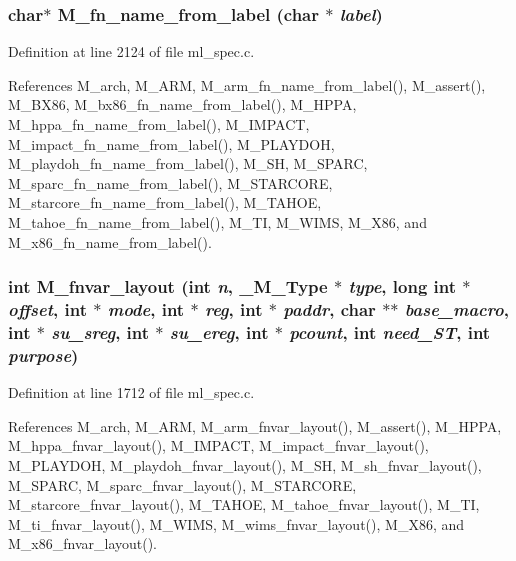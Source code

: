 \subsubsection{\setlength{\rightskip}{0pt plus 5cm}char$\ast$ M\_\-fn\_\-name\_\-from\_\-label (char $\ast$ {\em label})}\label{m__spec_8h_941cbbae90c867b67c1f123ba1ffeb7a}




Definition at line 2124 of file ml\_\-spec.c.

References M\_\-arch, M\_\-ARM, M\_\-arm\_\-fn\_\-name\_\-from\_\-label(), M\_\-assert(), M\_\-BX86, M\_\-bx86\_\-fn\_\-name\_\-from\_\-label(), M\_\-HPPA, M\_\-hppa\_\-fn\_\-name\_\-from\_\-label(), M\_\-IMPACT, M\_\-impact\_\-fn\_\-name\_\-from\_\-label(), M\_\-PLAYDOH, M\_\-playdoh\_\-fn\_\-name\_\-from\_\-label(), M\_\-SH, M\_\-SPARC, M\_\-sparc\_\-fn\_\-name\_\-from\_\-label(), M\_\-STARCORE, M\_\-starcore\_\-fn\_\-name\_\-from\_\-label(), M\_\-TAHOE, M\_\-tahoe\_\-fn\_\-name\_\-from\_\-label(), M\_\-TI, M\_\-WIMS, M\_\-X86, and M\_\-x86\_\-fn\_\-name\_\-from\_\-label().
\subsubsection{\setlength{\rightskip}{0pt plus 5cm}int M\_\-fnvar\_\-layout (int {\em n}, \bf{\_\-M\_\-Type} $\ast$ {\em type}, long int $\ast$ {\em offset}, int $\ast$ {\em mode}, int $\ast$ {\em reg}, int $\ast$ {\em paddr}, char $\ast$$\ast$ {\em base\_\-macro}, int $\ast$ {\em su\_\-sreg}, int $\ast$ {\em su\_\-ereg}, int $\ast$ {\em pcount}, int {\em need\_\-ST}, int {\em purpose})}\label{m__spec_8h_6acbb2b85cca52fe095e8cff68a2fbf1}




Definition at line 1712 of file ml\_\-spec.c.

References M\_\-arch, M\_\-ARM, M\_\-arm\_\-fnvar\_\-layout(), M\_\-assert(), M\_\-HPPA, M\_\-hppa\_\-fnvar\_\-layout(), M\_\-IMPACT, M\_\-impact\_\-fnvar\_\-layout(), M\_\-PLAYDOH, M\_\-playdoh\_\-fnvar\_\-layout(), M\_\-SH, M\_\-sh\_\-fnvar\_\-layout(), M\_\-SPARC, M\_\-sparc\_\-fnvar\_\-layout(), M\_\-STARCORE, M\_\-starcore\_\-fnvar\_\-layout(), M\_\-TAHOE, M\_\-tahoe\_\-fnvar\_\-layout(), M\_\-TI, M\_\-ti\_\-fnvar\_\-layout(), M\_\-WIMS, M\_\-wims\_\-fnvar\_\-layout(), M\_\-X86, and M\_\-x86\_\-fnvar\_\-layout().
